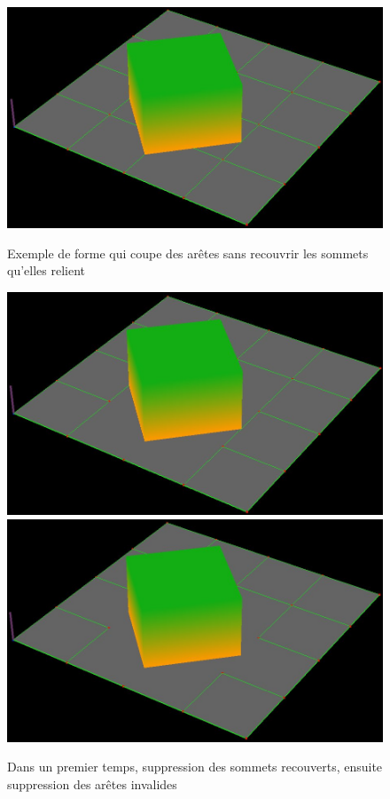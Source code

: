 \documentclass[a4paper,12pt]{report}
\begin{document}
\begin{figure}[h]
\centering
\includegraphics[scale=0.25]{Images/1-maillage.jpg}
\caption{Exemple de forme qui coupe des arêtes sans recouvrir les sommets qu'elles relient}
\includegraphics[scale=0.23]{Images/2-SuppressionSommet.jpg}
\includegraphics[scale=0.23]{Images/3-SuppressionAretes.jpg}
\caption{Dans un premier temps, suppression des sommets recouverts, ensuite suppression des arêtes invalides}
\end{figure}
\vspace{0.5cm}
\end{document}
